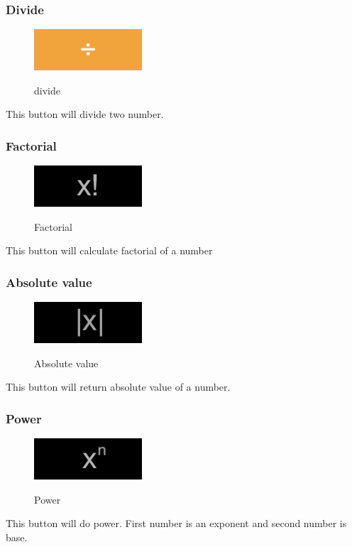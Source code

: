 \documentclass[11pt, a4paper]{article}
\begin{document}
    \subsubsection{Divide}
    \label{subsubsec:division}
        \begin{figure}[hbt!]
            \caption{divide}
            \includegraphics[scale = 0.2]{divide}
            \centering
            \label{fig:div}
        \end{figure}
        This button will divide two number.
    \subsubsection{Factorial}
    \label{subsubsec:factorial}
        \begin{figure}[hbt!]
            \caption{Factorial}
            \includegraphics[scale = 0.2]{factorial}
            \centering
            \label{fig:fact}
        \end{figure}
        This button will calculate factorial of a number
    \subsubsection{Absolute value}
    \label{subsubsec:absolute_value}
        \begin{figure}[hbt!]
            \caption{Absolute value}
            \includegraphics[scale = 0.2]{abs}
            \centering
            \label{fig:abs_v}
        \end{figure}
        This button will return absolute value of a number.
        
    \subsubsection{Power}
    \label{subsubsec:power}
        \begin{figure}[hbt!]
            \caption{Power}
            \includegraphics[scale = 0.2]{n-th_power}
            \centering
            \label{fig:pow}
        \end{figure}
        This button will do power. First number is an exponent and second number is base.
        
\end{document}

